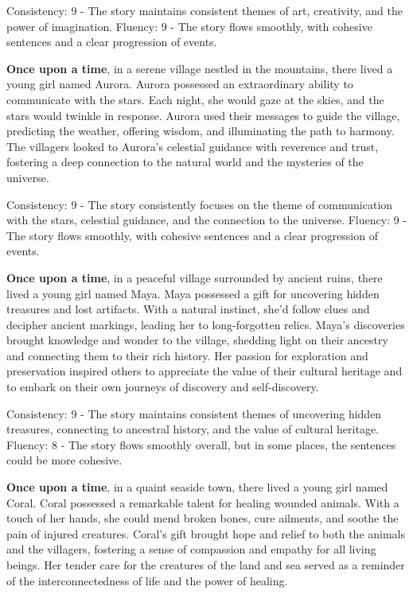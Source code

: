 \documentclass{article}
\begin{document}
Consistency: 9 - The story maintains consistent themes of art, creativity, and the power of imagination.
Fluency: 9 - The story flows smoothly, with cohesive sentences and a clear progression of events.

\textbf{Once upon a time}, in a serene village nestled in the mountains, there lived a young girl named Aurora. Aurora possessed an extraordinary ability to communicate with the stars. Each night, she would gaze at the skies, and the stars would twinkle in response. Aurora used their messages to guide the village, predicting the weather, offering wisdom, and illuminating the path to harmony. The villagers looked to Aurora's celestial guidance with reverence and trust, fostering a deep connection to the natural world and the mysteries of the universe.

Consistency: 9 - The story consistently focuses on the theme of communication with the stars, celestial guidance, and the connection to the universe.
Fluency: 9 - The story flows smoothly, with cohesive sentences and a clear progression of events.

\textbf{Once upon a time}, in a peaceful village surrounded by ancient ruins, there lived a young girl named Maya. Maya possessed a gift for uncovering hidden treasures and lost artifacts. With a natural instinct, she'd follow clues and decipher ancient markings, leading her to long-forgotten relics. Maya's discoveries brought knowledge and wonder to the village, shedding light on their ancestry and connecting them to their rich history. Her passion for exploration and preservation inspired others to appreciate the value of their cultural heritage and to embark on their own journeys of discovery and self-discovery.

Consistency: 9 - The story maintains consistent themes of uncovering hidden treasures, connecting to ancestral history, and the value of cultural heritage.
Fluency: 8 - The story flows smoothly overall, but in some places, the sentences could be more cohesive.

\textbf{Once upon a time}, in a quaint seaside town, there lived a young girl named Coral. Coral possessed a remarkable talent for healing wounded animals. With a touch of her hands, she could mend broken bones, cure ailments, and soothe the pain of injured creatures. Coral's gift brought hope and relief to both the animals and the villagers, fostering a sense of compassion and empathy for all living beings. Her tender care for the creatures of the land and sea served as a reminder of the interconnectedness of life and the power of healing.
\end{document}
